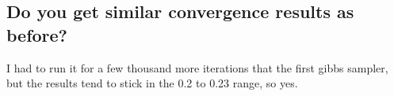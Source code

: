 \documentclass[20pt]{article} %
\begin{document}
\subsection{Do you get similar convergence results as before?}
I had to run it for a few thousand more iterations that the first gibbs sampler, but the results tend to stick in the 0.2 to 0.23 range, so yes.
\end{document}
